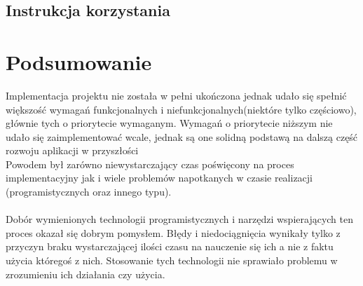 \documentclass[eng,printmode]{mgr}
\begin{document}
\section{Instrukcja korzystania}
\chapter{Podsumowanie}
Implementacja projektu nie została w pełni ukończona jednak udało się spełnić większość wymagań funkcjonalnych i niefunkcjonalnych(niektóre tylko częściowo), głównie tych o priorytecie wymaganym. Wymagań o priorytecie niższym nie udało się zaimplementować wcale, jednak są one solidną podstawą na dalszą część rozwoju aplikacji w przyszłości
\\
Powodem był zarówno niewystarczający czas poświęcony na proces implementacyjny jak i wiele problemów napotkanych w czasie realizacji (programistycznych oraz innego typu).
\\
\\
Dobór wymienionych technologii programistycznych i narzędzi wspierających ten proces okazał się dobrym pomysłem. Błędy i niedociągnięcia wynikały tylko z przyczyn braku wystarczającej ilości czasu na nauczenie się ich a nie z faktu użycia któregoś z nich. Stosowanie tych technologii nie sprawiało problemu w zrozumieniu ich działania czy użycia.
\end{document}
